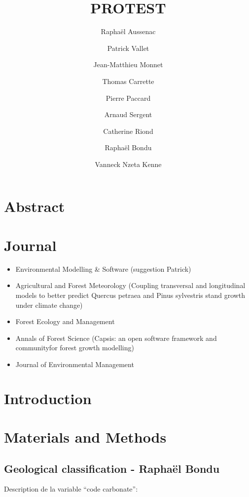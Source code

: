 \documentclass[a4paper]{article}
\title{PROTEST}
\author[1]{Raphaël Aussenac}
\author[1]{Patrick Vallet}
\author[1]{Jean-Matthieu Monnet}
\author[2]{Thomas Carrette}
\author[3]{Pierre Paccard}
\author[4]{Arnaud Sergent}
\author[5]{Catherine Riond}
\author[6]{Raphaël Bondu}
\author[1]{Vanneck Nzeta Kenne}
\affil[1]{IRSTEA grenoble}
\affil[2]{FCBA grenoble}
\affil[3]{PNR Bauges}
\affil[4]{IRSTEA Bordeaux}
\affil[5]{ONF}
\affil[6]{???}
\date{}
\begin{document}
\maketitle

\section*{Abstract}

\section*{Journal}
\begin{itemize}
    \item Environmental Modelling \& Software (suggestion Patrick)
    \item Agricultural and Forest Meteorology (Coupling transversal and longitudinal models to better predict Quercus petraea and Pinus sylvestris stand growth under climate change)
    \item Forest Ecology and Management
    \item Annals of Forest Science (Capsis: an open software framework and communityfor forest growth modelling)
    \item Journal of Environmental Management
\end{itemize}


\section*{Introduction}

\citep{cardinale2012biodiversity}

\section*{Materials and Methods}


\subsection*{Geological classification - Raphaël Bondu}

Description de la variable “code carbonate”:
\end{document}
